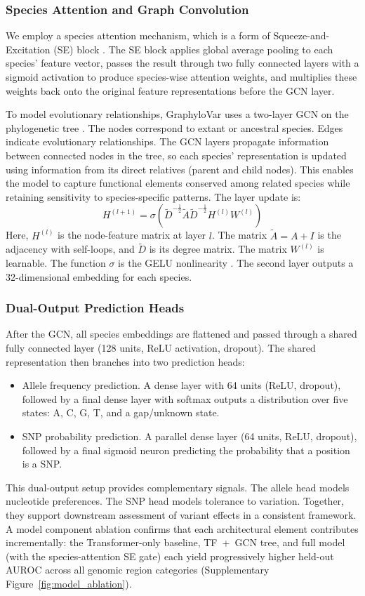 \documentclass[unnumsec,webpdf,contemporary,large]{oup-authoring-template}%
\newcommand{\rev}[1]{{\color{red}#1}}
\theoremstyle{thmstyleone}%
\theoremstyle{thmstyletwo}%
\theoremstyle{thmstylethree}%
\begin{document}
\subsubsection{Species Attention and Graph Convolution}
We employ a species attention mechanism, which is a form of Squeeze-and-Excitation (SE) block \citep{hu2018squeeze}. The SE block applies global average pooling to each species' feature vector, passes the result through two fully connected layers with a sigmoid activation to produce species-wise attention weights, and multiplies these weights back onto the original feature representations before the GCN layer.

To model evolutionary relationships, GraphyloVar uses a two-layer GCN on the phylogenetic tree \citep{kipf2016semi}. The nodes correspond to extant or ancestral species. Edges indicate evolutionary relationships. The GCN layers propagate information between connected nodes in the tree, so each species' representation is updated using information from its direct relatives (parent and child nodes). This enables the model to capture functional elements conserved among related species while retaining sensitivity to species-specific patterns. The layer update is:
\[
H^{(l+1)} = \sigma\!\left(\tilde{D}^{-\frac{1}{2}}\tilde{A}\tilde{D}^{-\frac{1}{2}}H^{(l)}W^{(l)}\right)
\]
Here, \(H^{(l)}\) is the node-feature matrix at layer \(l\). The matrix \(\tilde{A} = A + I\) is the adjacency with self-loops, and \(\tilde{D}\) is its degree matrix. The matrix \(W^{(l)}\) is learnable. The function \(\sigma\) is the GELU nonlinearity \citep{GeluHendrycks2016}. The second layer outputs a 32-dimensional embedding for each species.

\subsubsection{Dual-Output Prediction Heads}

After the GCN, all species embeddings are flattened and passed through a shared fully connected layer (128 units, ReLU activation, dropout). The shared representation then branches into two prediction heads:
\begin{itemize}
  \item Allele frequency prediction. A dense layer with 64 units (ReLU, dropout), followed by a final dense layer with softmax outputs a distribution over five states: A, C, G, T, and a gap/unknown state.
  \item SNP probability prediction. A parallel dense layer (64 units, ReLU, dropout), followed by a final sigmoid neuron predicting the probability that a position is a SNP.
\end{itemize}
This dual-output setup provides complementary signals. The allele head models nucleotide preferences. The SNP head models tolerance to variation. Together, they support downstream assessment of variant effects in a consistent framework. \rev{A model component ablation confirms that each architectural element contributes incrementally: the Transformer-only baseline, TF~+~GCN tree, and full model (with the species-attention SE gate) each yield progressively higher held-out AUROC across all genomic region categories (Supplementary Figure~\ref{fig:model_ablation}).}
\end{document}
